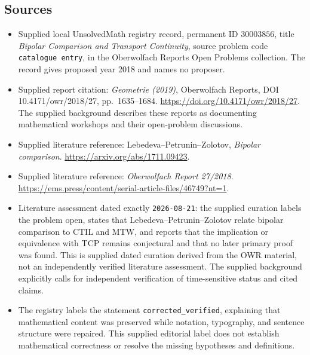 \documentclass[11pt]{article}
\begin{document}
\subsection{Sources}
\begin{itemize}
\item Supplied local UnsolvedMath registry record, permanent ID $30003856$, title \emph{Bipolar Comparison and Transport Continuity}, source problem code \texttt{catalogue entry}, in the Oberwolfach Reports Open Problems collection. The record gives proposed year 2018 and names no proposer.
\item Supplied report citation: \emph{Geometrie (2019)}, Oberwolfach Reports, DOI 10.4171/owr/2018/27, pp.\ 1635--1684. \url{https://doi.org/10.4171/owr/2018/27}. The supplied background describes these reports as documenting mathematical workshops and their open-problem discussions.
\item Supplied literature reference: Lebedeva--Petrunin--Zolotov, \emph{Bipolar comparison}. \url{https://arxiv.org/abs/1711.09423}.
\item Supplied literature reference: \emph{Oberwolfach Report 27/2018}. \url{https://ems.press/content/serial-article-files/46749?nt=1}.
\item Literature assessment dated exactly \texttt{2026-08-21}: the supplied curation labels the problem open, states that Lebedeva--Petrunin--Zolotov relate bipolar comparison to CTIL and MTW, and reports that the implication or equivalence with TCP remains conjectural and that no later primary proof was found. This is supplied dated curation derived from the OWR material, not an independently verified literature assessment. The supplied background explicitly calls for independent verification of time-sensitive status and cited claims.
\item The registry labels the statement \texttt{corrected\_verified}, explaining that mathematical content was preserved while notation, typography, and sentence structure were repaired. This supplied editorial label does not establish mathematical correctness or resolve the missing hypotheses and definitions.
\end{itemize}
\end{document}
